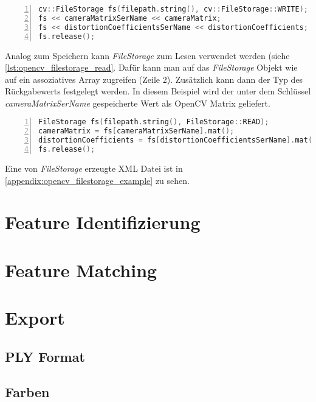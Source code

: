 \begin{lstlisting}[language=c++, numbers=left, breaklines=true, breakatwhitespace=false, label=lst:opencv_filestorage, caption=Schreiben mit OpenCV Filestorage]
cv::FileStorage fs(filepath.string(), cv::FileStorage::WRITE);
fs << cameraMatrixSerName << cameraMatrix;
fs << distortionCoefficientsSerName << distortionCoefficients;
fs.release();
\end{lstlisting}

Analog zum Speichern kann \emph{FileStorage} zum Lesen verwendet werden (siehe \autoref{lst:opencv_filestorage_read}.
Dafür kann man auf das \emph{FileStorage} Objekt wie auf ein assoziatives Array zugreifen (Zeile 2).
Zusätzlich kann dann der Typ des Rückgabewerts festgelegt werden.
In diesem Beispiel wird der unter dem Schlüssel \emph{cameraMatrixSerName} gespeicherte Wert als OpenCV Matrix geliefert.

\begin{lstlisting}[language=c++, numbers=left, breaklines=true, breakatwhitespace=false, label=lst:opencv_filestorage_read, caption=Lesen mit OpenCV Filestorage]
FileStorage fs(filepath.string(), FileStorage::READ);
cameraMatrix = fs[cameraMatrixSerName].mat();
distortionCoefficients = fs[distortionCoefficientsSerName].mat();
fs.release();
\end{lstlisting}


Eine von \emph{FileStorage} erzeugte XML Datei ist in \autoref{appendix:opencv_filestorage_example}  zu sehen.

\section{Feature Identifizierung}

\section{Feature Matching}



\section{Export}
\subsection{PLY Format}
\subsection{Farben}


